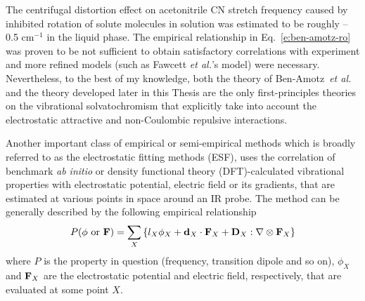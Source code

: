 \documentclass[b5paper,oneside,fleqn,11pt]{book}
\begin{document}
\begin{refsection}
The centrifugal distortion effect on acetonitrile CN stretch frequency 
caused by inhibited rotation of solute molecules
in solution was estimated to be roughly --0.5 cm$^{-1}$ in the liquid phase.  
The empirical relationship in Eq.~\eqref{e:ben-amotz-ro} was proven to be not sufficient to obtain 
satisfactory correlations with experiment and more refined
models (such as Fawcett \emph{et al.}'s model) were necessary. \citep{Reimers.Hall.JACS.1999} 
Nevertheless, 
to the best of my knowledge, both the theory of Ben-Amotz~\emph{et al.} \citep{Ben-Amotz.Lee.Cho.List.JCP.1992} 
and the theory
developed later in this Thesis are the only first-principles theories on the
vibrational solvatochromism that explicitly take into account the electrostatic 
attractive and non\hyp{}Coulombic repulsive interactions.

Another important class of empirical or semi\hyp{}empirical methods which is broadly referred 
to as the electrostatic fitting methods (ESF), uses the correlation of benchmark 
\emph{ab initio} or density functional theory (DFT)-calculated vibrational properties
with electrostatic potential, electric field or its gradients, that are estimated at various
points in space around an IR probe. \citep{Kwac.Cho.II.JCP.2003,Ham.Kim.Lee.Cho.JCP.2003,Bour.Keiderling.JCP.2003,
Schmidt.Corcelli.Skinner.JCP.2004,Corcelli.Lawrence.Skinner.JCP.2004,Hahn.Lee.Cho.JCP.2004,Kwac.Lee.Cho.JCP.2004,
Choi.Hahn.Cho.IJQC.2005,Kwac.Cho.JRS.2005,Watson.Hirst.MP.2005,
DeCamp.DeFlores.McCracken.Tokmakoff.Kwac.Cho.JPCB.2005,Hayashi.Jansen.Zhuang.Mukamel.JPCA.2005,
Hayashi.Zhuang.Mukamel.JPCA.2005,Bour.Michalik.Kapitan.JCP.2005,
Jansen.Dijkstra.Watson.Hirst.Knoester.JCP.2006,
Jansen.Knoester.JCP.2006,
Choi.Oh.Lee.Lee.Cho.JCP.2008,Oh.Choi.Lee.Han.Lee.Cho.JCP.2008,
Choi.Oh.Cho.JCP.2008,
Lin.Shorb.Mukherjee.Zanni.Skinner.JPCB.2009,Lee.Choi.Cho.PCCP.2010,Choi.Cho.JCP.2011,
Roy.Lessing.Meisl.Ganim.Tokmakoff.Knoester.Jansen.JCP.2011,Choi.Raleigh.Cho.JCPL.2011,
Lee.Choi.Cho.JCP.2012,Torii.JCPL.2015,Torii.Noge.PCCP.2016}
%
The method can be generally described by the following empirical relationship
%
\begin{equation} \label{e:esf}
 P(\phi \text{ or } {\bf F}) = \sum_X \left\{ l_X \phi_X + {\bf d}_X \cdot {\bf F}_X + {\bf D}_X : \nabla \otimes {\bf F}_X \right\}
\end{equation}
%
where $P$ is the property in question (frequency, transition dipole and so on), 
$\phi_X$ and ${\bf F}_X$ are the electrostatic potential and electric field, respectively, that are
evaluated at some point $X$.

\end{refsection}
\end{document}
